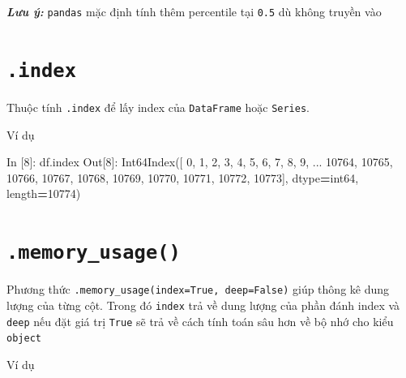 \documentclass[
]{book}
\makeatletter
\newenvironment{Shaded}{\begin{snugshade}}{\end{snugshade}}
\newcommand{\DecValTok}[1]{\textcolor[rgb]{0.00,0.00,0.81}{#1}}
\newcommand{\NormalTok}[1]{#1}
\newcommand{\OperatorTok}[1]{\textcolor[rgb]{0.81,0.36,0.00}{\textbf{#1}}}
\newcommand{\StringTok}[1]{\textcolor[rgb]{0.31,0.60,0.02}{#1}}
\newenvironment{kframe}{%
\medskip{}
\setlength{\fboxsep}{.8em}
 \def\at@end@of@kframe{}%
 \ifinner\ifhmode%
  \def\at@end@of@kframe{\end{minipage}}%
  \begin{minipage}{\columnwidth}%
 \fi\fi%
 \def\FrameCommand##1{\hskip\@totalleftmargin \hskip-\fboxsep
 \colorbox{shadecolor}{##1}\hskip-\fboxsep
     \hskip-\linewidth \hskip-\@totalleftmargin \hskip\columnwidth}%
 \MakeFramed {\advance\hsize-\width
   \@totalleftmargin\z@ \linewidth\hsize
   \@setminipage}}%
 {\par\unskip\endMakeFramed%
 \at@end@of@kframe}
\newenvironment{rmdblock}[1]
  {
  \begin{itemize}
  \renewcommand{\labelitemi}{
    \raisebox{-.7\height}[0pt][0pt]{
      {\setkeys{Gin}{width=3em,keepaspectratio}\texttt{[image: images/\#1]}}
    }
  }
  \setlength{\fboxsep}{1em}
  \begin{kframe}
  \item
  }
  {
  \end{kframe}
  \end{itemize}
  }
\newenvironment{rmdnote}
  {\begin{rmdblock}{note}}
  {\end{rmdblock}}
\makeatother
\begin{document}
\begin{rmdnote}
\textbf{\emph{Lưu ý:}}
\texttt{pandas} mặc định tính thêm percentile tại \texttt{0.5} dù không truyền vào
\end{rmdnote}

\hypertarget{index}{%
\section{\texorpdfstring{\texttt{.index}}{.index}}\label{index}}

Thuộc tính \texttt{.index} để lấy index của \texttt{DataFrame} hoặc \texttt{Series}.

Ví dụ

\begin{Shaded}
\begin{Highlighting}[]
\NormalTok{In [}\DecValTok{8}\NormalTok{]: df.index}
\NormalTok{Out[}\DecValTok{8}\NormalTok{]: }
\NormalTok{Int64Index([    }\DecValTok{0}\NormalTok{,     }\DecValTok{1}\NormalTok{,     }\DecValTok{2}\NormalTok{,     }\DecValTok{3}\NormalTok{,     }\DecValTok{4}\NormalTok{,     }\DecValTok{5}\NormalTok{,     }\DecValTok{6}\NormalTok{,     }\DecValTok{7}\NormalTok{,     }\DecValTok{8}\NormalTok{,}
                \DecValTok{9}\NormalTok{,}
\NormalTok{            ...}
            \DecValTok{10764}\NormalTok{, }\DecValTok{10765}\NormalTok{, }\DecValTok{10766}\NormalTok{, }\DecValTok{10767}\NormalTok{, }\DecValTok{10768}\NormalTok{, }\DecValTok{10769}\NormalTok{, }\DecValTok{10770}\NormalTok{, }\DecValTok{10771}\NormalTok{, }\DecValTok{10772}\NormalTok{,}
            \DecValTok{10773}\NormalTok{],}
\NormalTok{           dtype}\OperatorTok{=}\StringTok{\textquotesingle{}int64\textquotesingle{}}\NormalTok{, length}\OperatorTok{=}\DecValTok{10774}\NormalTok{)}
\end{Highlighting}
\end{Shaded}

\hypertarget{memory_usage}{%
\section{\texorpdfstring{\texttt{.memory\_usage()}}{.memory\_usage()}}\label{memory_usage}}

Phương thức \texttt{.memory\_usage(index=True,\ deep=False)} giúp thông kê dung lượng của từng cột. Trong đó \texttt{index} trả về dung lượng của phần đánh index và \texttt{deep} nếu đặt giá trị \texttt{True} sẽ trả về cách tính toán sâu hơn về bộ nhớ cho kiểu \texttt{object}

Ví dụ
\end{document}
